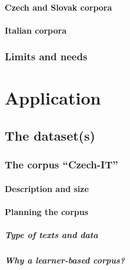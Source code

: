 \documentclass[
  a4paper,
  twoside,
  12pt,
  chapterprefix=false,
  bibliography=totocnumbered,
  listof=flat]{scrbook}
\begin{document}
\hypertarget{czech-and-slovak-corpora}{%
\subsection{Czech and Slovak corpora}\label{czech-and-slovak-corpora}}

\hypertarget{italian-corpora}{%
\subsection{Italian corpora}\label{italian-corpora}}

\hypertarget{limits-and-needs}{%
\section{Limits and needs}\label{limits-and-needs}}

\part{Application}

\hypertarget{the-datasets}{%
\chapter{The dataset(s)}\label{the-datasets}}

\hypertarget{the-corpus-czech-it}{%
\section{The corpus ``Czech-IT''}\label{the-corpus-czech-it}}

\hypertarget{description-and-size-1}{%
\subsection{Description and size}\label{description-and-size-1}}

\hypertarget{planning-the-corpus}{%
\subsection{Planning the corpus}\label{planning-the-corpus}}

\hypertarget{type-of-texts-and-data}{%
\subsubsection{Type of texts and data}\label{type-of-texts-and-data}}

\hypertarget{why-a-learner-based-corpus}{%
\subsubsection{Why a learner-based corpus?}\label{why-a-learner-based-corpus}}
\end{document}
